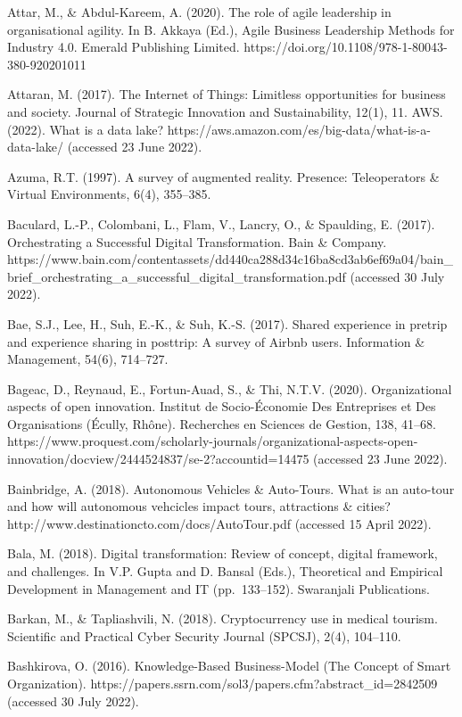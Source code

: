 \documentclass[
  letterpaper,
  DIV=11,
  numbers=noendperiod]{scrreprt}
\begin{document}
Attar, M., \& Abdul-Kareem, A. (2020). The role of agile leadership in
organisational agility. In B. Akkaya (Ed.), Agile Business Leadership
Methods for Industry 4.0. Emerald Publishing Limited.
https://doi.org/10.1108/978-1-80043-380-920201011

Attaran, M. (2017). The Internet of Things: Limitless opportunities for
business and society. Journal of Strategic Innovation and
Sustainability, 12(1), 11. AWS. (2022). What is a data lake?
https://aws.amazon.com/es/big-data/what-is-a-data-lake/ (accessed 23
June 2022).

Azuma, R.T. (1997). A survey of augmented reality. Presence:
Teleoperators \& Virtual Environments, 6(4), 355--385.

Baculard, L.-P., Colombani, L., Flam, V., Lancry, O., \& Spaulding, E.
(2017). Orchestrating a Successful Digital Transformation. Bain \&
Company.
https://www.bain.com/contentassets/dd440ca288d34c16ba8cd3ab6ef69a04/bain\_brief\_orchestrating\_a\_successful\_digital\_transformation.pdf
(accessed 30 July 2022).

Bae, S.J., Lee, H., Suh, E.-K., \& Suh, K.-S. (2017). Shared experience
in pretrip and experience sharing in posttrip: A survey of Airbnb users.
Information \& Management, 54(6), 714--727.

Bageac, D., Reynaud, E., Fortun-Auad, S., \& Thi, N.T.V. (2020).
Organizational aspects of open innovation. Institut de Socio-Économie
Des Entreprises et Des Organisations (Écully, Rhône). Recherches en
Sciences de Gestion, 138, 41--68.
https://www.proquest.com/scholarly-journals/organizational-aspects-open-innovation/docview/2444524837/se-2?accountid=14475
(accessed 23 June 2022).

Bainbridge, A. (2018). Autonomous Vehicles \& Auto-Tours. What is an
auto-tour and how will autonomous vehcicles impact tours, attractions \&
cities? http://www.destinationcto.com/docs/AutoTour.pdf (accessed 15
April 2022).

Bala, M. (2018). Digital transformation: Review of concept, digital
framework, and challenges. In V.P. Gupta and D. Bansal (Eds.),
Theoretical and Empirical Development in Management and IT
(pp.~133--152). Swaranjali Publications.

Barkan, M., \& Tapliashvili, N. (2018). Cryptocurrency use in medical
tourism. Scientific and Practical Cyber Security Journal (SPCSJ), 2(4),
104--110.

Bashkirova, O. (2016). Knowledge-Based Business-Model (The Concept of
Smart Organization).
https://papers.ssrn.com/sol3/papers.cfm?abstract\_id=2842509 (accessed
30 July 2022).
\end{document}
